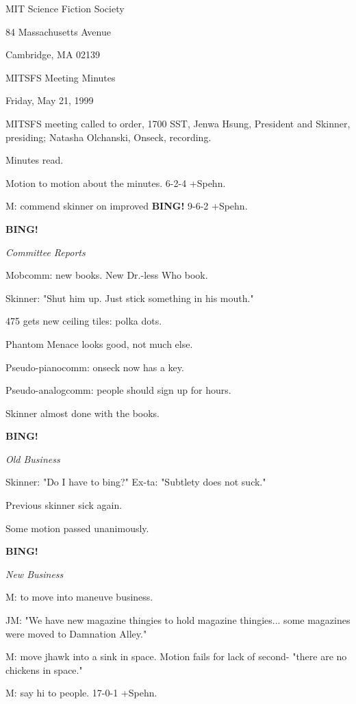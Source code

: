 \documentclass[12pt]{article}
\newcommand{\bing}{{\bf BING!} }
\newcommand{\goto}[1]{\bing \vskip 12pt \centerline{{\em{#1}}}}
\begin{document}
\begin{center}

MIT Science Fiction Society 

84 Massachusetts Avenue

Cambridge, MA 02139

\vspace{12pt}

MITSFS Meeting Minutes 

Friday, May 21, 1999

\end{center}
 
\vspace{18pt}

\setlength{\parskip}{6pt}

\noindent
MITSFS meeting called to order, 1700 SST,
Jenwa Hsung, President and Skinner, presiding; Natasha Olchanski, Onseck, recording.

Minutes read.

Motion to motion about the minutes. 6-2-4 +Spehn.

M: commend skinner on improved \bing 9-6-2 +Spehn.

\goto{Committee Reports}

Mobcomm: new books. New Dr.-less Who book.

Skinner: "Shut him up. Just stick something in his mouth."

475 gets new ceiling tiles: polka dots.

Phantom Menace looks good, not much else.

Pseudo-pianocomm: onseck now has a key.

Pseudo-analogcomm: people should sign up for hours.

Skinner almost done with the books.

\goto{Old Business}

Skinner: "Do I have to bing?" Ex-ta: "Subtlety does not suck."

Previous skinner sick again.

Some motion passed unanimously.

\goto{New Business}

M: to move into maneuve business.

JM: "We have new magazine thingies to hold magazine thingies... some magazines were moved to Damnation Alley."

M: move jhawk into a sink in space. Motion fails for lack of second- "there are no chickens in space."

M: say hi to people. 17-0-1 +Spehn.
\end{document}
